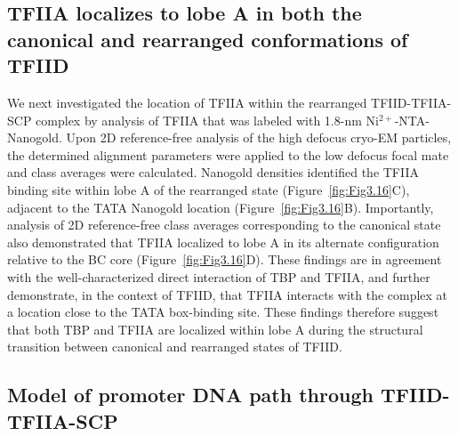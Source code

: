 \subsection{TFIIA localizes to lobe A in both the canonical and rearranged conformations of TFIID}
We next investigated the location of TFIIA within the rearranged TFIID-TFIIA-SCP complex by analysis of TFIIA that was labeled with 1.8-nm Ni$^{2+}$-NTA-Nanogold. Upon 2D reference-free analysis of the high defocus cryo-EM particles, the determined alignment parameters were applied to the low defocus focal mate and class averages were calculated. Nanogold densities identified the TFIIA binding site within lobe A of the rearranged state (Figure~\ref{fig:Fig3.16}C), adjacent to the TATA Nanogold location (Figure~\ref{fig:Fig3.16}B). Importantly, analysis of 2D reference-free class averages corresponding to the canonical state also demonstrated that TFIIA localized to lobe A in its alternate configuration relative to the BC core (Figure~\ref{fig:Fig3.16}D). These findings are in agreement with the well-characterized direct interaction of TBP and TFIIA, and further demonstrate, in the context of TFIID, that TFIIA interacts with the complex at a location close to the TATA box-binding site. These findings therefore suggest that both TBP and TFIIA are localized within lobe A during the structural transition between canonical and rearranged states of TFIID.

\subsection{Model of promoter DNA path through TFIID-TFIIA-SCP}

